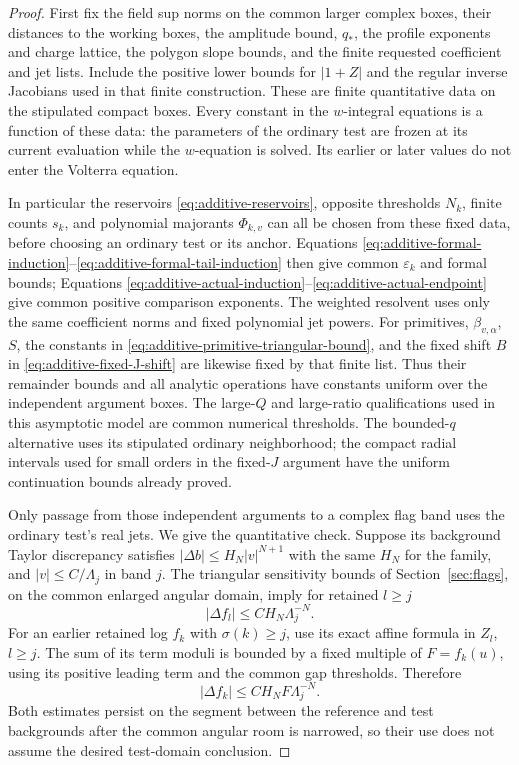 \begin{proof}
First fix the field sup norms on the common larger complex boxes,
their distances to the working boxes, the amplitude bound, $q_*$,
the profile exponents and charge lattice, the polygon slope bounds,
and the finite requested coefficient and jet lists.  Include the
positive lower bounds for $|1+Z|$ and the regular inverse Jacobians
used in that finite construction.  These are finite quantitative
data on the stipulated compact boxes.  Every constant in the
$w$-integral equations is a function of these data: the parameters of
the ordinary test are frozen at its current evaluation while the
$w$-equation is solved.  Its earlier or later values do not enter the
Volterra equation.

In particular the reservoirs \eqref{eq:additive-reservoirs}, opposite
thresholds $N_k$, finite counts $s_k$, and polynomial majorants
$\Phi_{k,v}$ can all be chosen from these fixed data, before choosing
an ordinary test or its anchor.  Equations
\eqref{eq:additive-formal-induction}--\eqref{eq:additive-formal-tail-induction}
then give common $\varepsilon_k$ and formal bounds; Equations
\eqref{eq:additive-actual-induction}--\eqref{eq:additive-actual-endpoint}
give common positive comparison exponents.  The weighted resolvent
uses only the same coefficient norms and fixed polynomial jet powers.
For primitives, $\beta_{v,\alpha}$, $S$, the constants in
\eqref{eq:additive-primitive-triangular-bound}, and the fixed shift
$B$ in \eqref{eq:additive-fixed-J-shift} are likewise fixed by that
finite list.  Thus their remainder bounds and all analytic operations
have constants uniform over the independent argument boxes.  The
large-$Q$ and large-ratio qualifications used in this asymptotic model
are common numerical thresholds.  The bounded-$q$ alternative uses
its stipulated ordinary neighborhood; the compact radial intervals
used for small orders in the fixed-$J$ argument have the uniform
continuation bounds already proved.

Only passage from those independent arguments to a complex flag band
uses the ordinary test's real jets.  We give the quantitative check.
Suppose its background Taylor discrepancy satisfies
$|\Delta b|\le H_N|v|^{N+1}$ with the same $H_N$ for the family,
and $|v|\le C/\Lambda_j$ in band $j$.  The triangular sensitivity
bounds of Section~\ref{sec:flags}, on the common enlarged angular
domain, imply for retained $l\ge j$
\begin{equation}\label{eq:additive-family-later-log}
 |\Delta f_l|\le C H_N\Lambda_j^{-N}.
\end{equation}
For an earlier retained log $f_k$ with $\sigma(k)\ge j$, use its exact
affine formula in $Z_l$, $l\ge j$.  The sum of its term moduli is
bounded by a fixed multiple of $F=f_k(u)$, using its positive leading
term and the common gap thresholds.  Therefore
\begin{equation}\label{eq:additive-family-earlier-log}
 |\Delta f_k|\le C H_N F\Lambda_j^{-N}.
\end{equation}
Both estimates persist on the segment between the reference and test
backgrounds after the common angular room is narrowed, so their use
does not assume the desired test-domain conclusion.


\end{proof}
